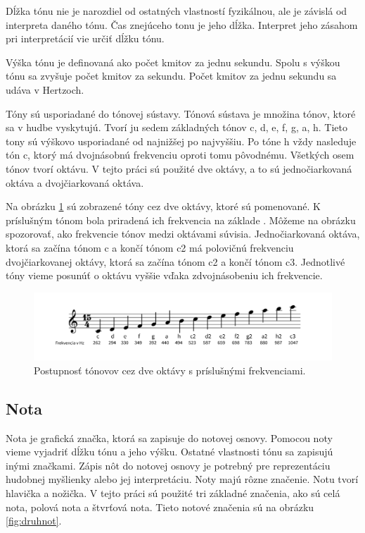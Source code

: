 Dĺžka tónu nie je narozdiel od ostatných vlastností fyzikálnou, ale je závislá od interpreta daného tónu. Čas znejúceho tonu je jeho dĺžka. Interpret jeho zásahom pri interpretácií vie určiť dĺžku tónu.

Výška tónu je definovaná ako počet kmitov za jednu sekundu. Spolu s výškou tónu sa zvyšuje počet kmitov za sekundu. Počet kmitov za jednu sekundu sa udáva v Hertzoch.

Tóny sú usporiadané do tónovej sústavy. Tónová sústava je množina tónov, ktoré sa v hudbe vyskytujú. Tvorí ju sedem základných tónov c, d, e, f, g, a, h. Tieto tony sú výškovo usporiadané od najnižšej po najvyššiu. Po tóne h vždy nasleduje tón c, ktorý má dvojnásobnú frekvenciu oproti tomu pôvodnému. Všetkých osem tónov tvorí oktávu. V tejto práci sú použité dve oktávy, a to sú jednočiarkovaná oktáva a dvojčiarkovaná oktáva.

Na obrázku \ref{fig:tonfrek} sú zobrazené tóny cez dve oktávy, ktoré sú pomenované. K príslušným tónom bola priradená ich frekvencia na základe \cite{strankaFrekvencii}. Môžeme na obrázku spozorovať, ako frekvencie tónov medzi oktávami súvisia. Jednočiarkovaná oktáva, ktorá sa začína tónom c a končí tónom c2 má polovičnú frekvenciu dvojčiarkovanej oktávy, ktorá sa začína tónom c2 a končí tónom c3. Jednotlivé tóny vieme posunúť o oktávu vyššie vďaka zdvojnásobeniu ich frekvencie.

\begin{figure}[H]
\centering
\includegraphics[scale=0.4]{obrazky-figures/Tonyafrekvencie.png}
\caption{Postupnosť tónovov cez dve oktávy s príslušnými frekvenciami.}
\label{fig:tonfrek}
\end{figure}

\subsection{Nota}
\label{subs:nota}
Nota je grafická značka, ktorá sa zapisuje do notovej osnovy. Pomocou noty vieme vyjadriť dĺžku tónu a jeho výšku. Ostatné vlastnosti tónu sa zapisujú inými značkami. Zápis nôt do notovej osnovy je potrebný pre reprezentáciu hudobnej myšlienky alebo jej interpretáciu. Noty majú rôzne značenie. Notu tvorí hlavička a nožička. V tejto práci sú použité tri základné značenia, ako sú celá nota, polová nota a štvrťová nota. Tieto notové značenia sú na obrázku \ref{fig:druhnot}.

